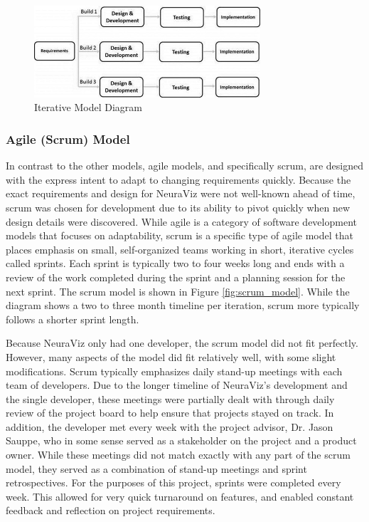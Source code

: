 \begin{figure}[htb]
    \centering
    \includegraphics[width=0.75\textwidth]{02_dev_process/res/sdlc_iterative_model.jpg}
    \caption[Iterative Model Diagram]{Iterative Model Diagram \cite{tutorialspointIterative}}
    \label{fig:iterative_model}
\end{figure}

\subsubsection{Agile (Scrum) Model}
In contrast to the other models, agile models, and specifically scrum, are designed with the express intent to adapt to changing requirements quickly. Because the exact requirements and design for NeuraViz were not well-known ahead of time, scrum was chosen for development due to its ability to pivot quickly when new design details were discovered. While agile is a category of software development models that focuses on adaptability, scrum is a specific type of agile model that places emphasis on small, self-organized teams working in short, iterative cycles called sprints. Each sprint is typically two to four weeks long and ends with a review of the work completed during the sprint and a planning session for the next sprint. The scrum model is shown in Figure \ref{fig:scrum_model}. While the diagram shows a two to three month timeline per iteration, scrum more typically follows a shorter sprint length.

Because NeuraViz only had one developer, the scrum model did not fit perfectly. However, many aspects of the model did fit relatively well, with some slight modifications. Scrum typically emphasizes daily stand-up meetings with each team of developers. Due to the longer timeline of NeuraViz's development and the single developer, these meetings were partially dealt with through daily review of the project board to help ensure that projects stayed on track. In addition, the developer met every week with the project advisor, Dr. Jason Sauppe, who in some sense served as a stakeholder on the project and a product owner. While these meetings did not match exactly with any part of the scrum model, they served as a combination of stand-up meetings and sprint retrospectives. For the purposes of this project, sprints were completed every week. This allowed for very quick turnaround on features, and enabled constant feedback and reflection on project requirements.

